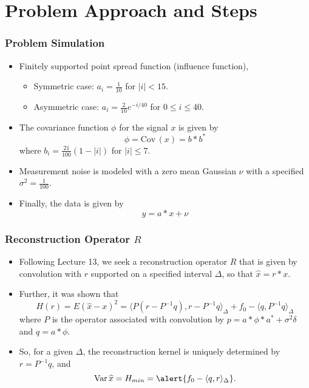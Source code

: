 \documentclass[t]{beamer}
\begin{document}
\section{Problem Approach and Steps} 
\begin{frame}
\frametitle{Problem Simulation}
\begin{itemize}
\item Finitely supported point spread function (influence function), 
  \begin{itemize}
    \item Symmetric case: $a_i = \frac 1{10}$ for $|i| < 15$.  
    \item Asymmetric case: $a_i = \frac 2{10} e^{-i/40}$ for $0\le i\le 40$.
  \end{itemize}
\item The covariance function $\phi$ for the signal $x$ is given by 
$$
\phi = \mathrm{Cov}\,(x) = b*b^{*}
$$
  where $b_i = \frac {21}{100}(1-|i|)$ for $|i| \le 7$. 
\item Measurement noise is modeled with a zero mean Gaussian $\nu$ with a specified $\sigma^2 = \frac 1{100}$.
\item Finally, the data is given by
$$
  y = a * x + \nu
$$
\end{itemize}
\end{frame}

\begin{frame}
  \frametitle{Reconstruction Operator $R$}  
  \begin{itemize}
    \item Following Lecture 13, we seek a reconstruction operator $R$ that is given by convolution with $r$ supported on a specified interval $\Delta$, so that $\widehat x = r*x$.
    \item Further, it was shown that
    $$
      H(r) = E( \widehat x - x )^2 = \langle P (r - P^{-1}q), r- P^{-1}q \rangle_{\Delta} + f_0 - \langle q, P^{-1}q\rangle_{\Delta}
    $$
    where $P$ is the operator associated with convolution by $p = a*\phi*a^* + \sigma^2\delta$ and $q = a*\phi$.
    \item So, for a given $\Delta$, the reconstruction kernel is uniquely determined by \alert{$r = P^{-1}q$}, and 
    $$
      \mathrm{Var}\, \widehat x = H_{min} = \alert{f_0 - \langle q, r\rangle_{\Delta}}.
    $$
  \end{itemize}
\end{frame}
\end{document}
